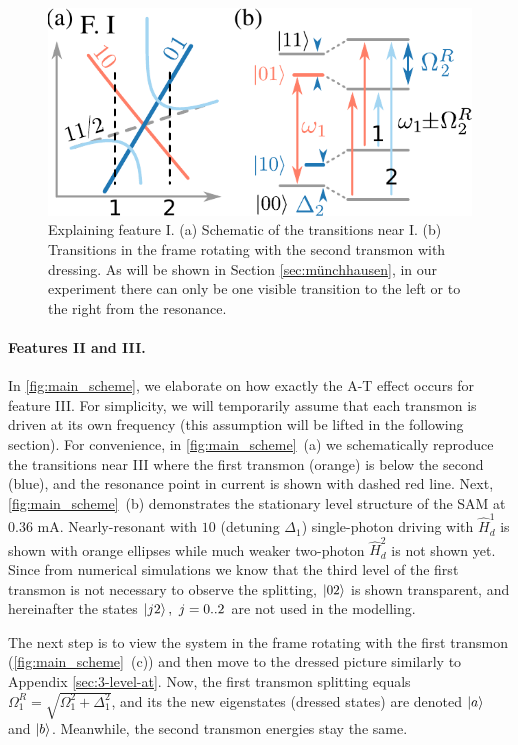 \documentclass[%
 pra,
 amsmath,amssymb,
 reprint,%
]{revtex4-1}
\begin{document}
\begin{figure}
	\label{fig:main_scheme}
\end{figure}

\begin{figure}
	\includegraphics[width=.9\linewidth]{topo_scheme}
	\caption{Explaining feature I. (a) Schematic of the transitions near I. (b) Transitions in the frame rotating with the second transmon with dressing. As will be shown in Section \ref{sec:münchhausen}, in our experiment there can only be one visible transition to the left or to the right from the resonance.}
	\label{fig:featureI}
\end{figure} 

\paragraph{Features II and III.}  

In \autoref{fig:main_scheme}, we elaborate on how exactly the A-T effect occurs for feature III. For simplicity, we will temporarily assume that each transmon is driven at its own frequency (this assumption will be lifted in the following section). For convenience, in \autoref{fig:main_scheme}~(a) we schematically reproduce the transitions near III where the first transmon (orange) is below the second (blue), and the resonance point in current is shown with dashed red line. Next, \autoref{fig:main_scheme}~(b) demonstrates the stationary level structure of the SAM at 0.36 mA. Nearly-resonant with $10$ (detuning $\Delta_1$) single-photon driving with $\hat H_d^1$ is shown with orange ellipses while much weaker two-photon $\hat H_d^2$ is not shown yet. Since from numerical simulations we know that the third level of the first transmon is not necessary to observe the splitting, $\ket{02}$ is shown transparent, and hereinafter the states $\ket{j2},\ j=0..2$ are not used in the modelling.

The next step is to view the system in the frame rotating with the first transmon (\autoref{fig:main_scheme}~(c)) and then move to the  dressed picture similarly to Appendix \ref{sec:3-level-at}. Now, the first transmon splitting equals $\Omega_{1}^R = \sqrt{\Omega_1^2+\Delta_1^2}$, and its the new eigenstates (dressed states) are denoted $\ket{a}$ and $\ket{b}$. Meanwhile, the second transmon energies stay the same.
\end{document}
